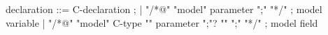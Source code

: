 \begin{syntax}
  declaration ::= C-declaration ;
  | {"/*@" "model" parameter ";" "*/"} ; model variable
  | "/*@" "model" C-type "{" parameter ";"? "}" ";" "*/" ; model field
\end{syntax}

